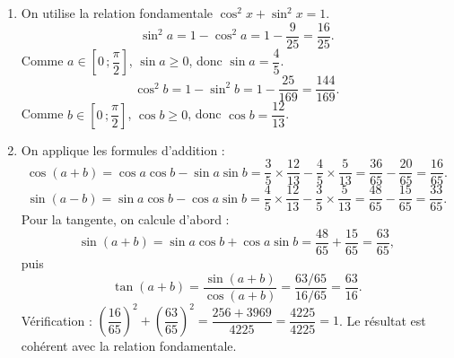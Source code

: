 \documentclass[11pt]{article}
\begin{document}
\begin{corrige}
\begin{enumerate}
\item On utilise la relation fondamentale $\cos^2 x+\sin^2 x=1$.
\[\sin^2 a=1-\cos^2 a=1-\dfrac{9}{25}=\dfrac{16}{25}.\]
Comme $a\in\left[0\,;\dfrac{\pi}{2}\right]$, $\sin a\geq 0$, donc $\sin a=\dfrac{4}{5}$.
\[\cos^2 b=1-\sin^2 b=1-\dfrac{25}{169}=\dfrac{144}{169}.\]
Comme $b\in\left[0\,;\dfrac{\pi}{2}\right]$, $\cos b\geq 0$, donc $\cos b=\dfrac{12}{13}$.
\item On applique les formules d'addition :
\[\cos(a+b)=\cos a\cos b-\sin a\sin b=\dfrac{3}{5}\times\dfrac{12}{13}-\dfrac{4}{5}\times\dfrac{5}{13}=\dfrac{36}{65}-\dfrac{20}{65}=\dfrac{16}{65}.\]
\[\sin(a-b)=\sin a\cos b-\cos a\sin b=\dfrac{4}{5}\times\dfrac{12}{13}-\dfrac{3}{5}\times\dfrac{5}{13}=\dfrac{48}{65}-\dfrac{15}{65}=\dfrac{33}{65}.\]
Pour la tangente, on calcule d'abord :
\[\sin(a+b)=\sin a\cos b+\cos a\sin b=\dfrac{48}{65}+\dfrac{15}{65}=\dfrac{63}{65},\]
puis
\[\tan(a+b)=\dfrac{\sin(a+b)}{\cos(a+b)}=\dfrac{63/65}{16/65}=\dfrac{63}{16}.\]
Vérification : $\left(\dfrac{16}{65}\right)^2+\left(\dfrac{63}{65}\right)^2=\dfrac{256+3969}{4225}=\dfrac{4225}{4225}=1$. Le résultat est cohérent avec la relation fondamentale.
\end{enumerate}
\end{corrige}
\end{document}
